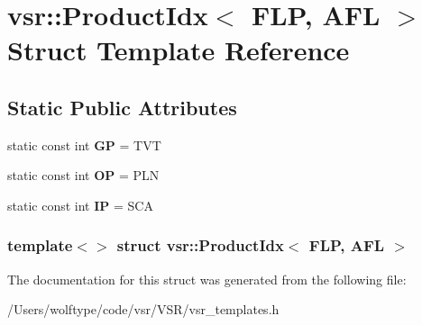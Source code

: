 \hypertarget{structvsr_1_1_product_idx_3_01_f_l_p_00_01_a_f_l_01_4}{\section{vsr\-:\-:Product\-Idx$<$ F\-L\-P, A\-F\-L $>$ Struct Template Reference}
\label{structvsr_1_1_product_idx_3_01_f_l_p_00_01_a_f_l_01_4}
}
\subsection*{Static Public Attributes}
\begin{DoxyCompactItemize}
\item 
\hypertarget{structvsr_1_1_product_idx_3_01_f_l_p_00_01_a_f_l_01_4_a3c423c0346cef317903216df491cc41e}{static const int {\bfseries G\-P} = T\-V\-T}\label{structvsr_1_1_product_idx_3_01_f_l_p_00_01_a_f_l_01_4_a3c423c0346cef317903216df491cc41e}

\item 
\hypertarget{structvsr_1_1_product_idx_3_01_f_l_p_00_01_a_f_l_01_4_acedaaf0a8a0a9f3c17cad137d5cb0821}{static const int {\bfseries O\-P} = P\-L\-N}\label{structvsr_1_1_product_idx_3_01_f_l_p_00_01_a_f_l_01_4_acedaaf0a8a0a9f3c17cad137d5cb0821}

\item 
\hypertarget{structvsr_1_1_product_idx_3_01_f_l_p_00_01_a_f_l_01_4_a10839a7e00d6c17d68d960489d2bbfab}{static const int {\bfseries I\-P} = S\-C\-A}\label{structvsr_1_1_product_idx_3_01_f_l_p_00_01_a_f_l_01_4_a10839a7e00d6c17d68d960489d2bbfab}

\end{DoxyCompactItemize}
\subsubsection*{template$<$$>$ struct vsr\-::\-Product\-Idx$<$ F\-L\-P, A\-F\-L $>$}



The documentation for this struct was generated from the following file\-:\begin{DoxyCompactItemize}
\item 
/\-Users/wolftype/code/vsr/\-V\-S\-R/vsr\-\_\-templates.\-h\end{DoxyCompactItemize}
